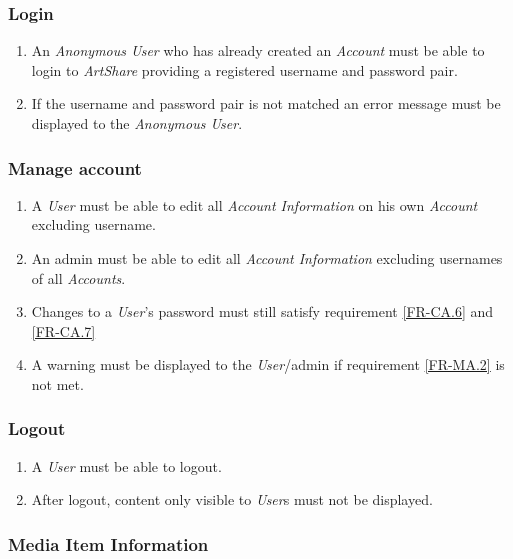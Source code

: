 \documentclass[../report.tex]{subfiles}
\begin{document}
\subsubsection {Login}
	
\begin{enumerate}[label=\textbf{FR-\twodigits*}, resume]
	\item An \textit{Anonymous User} who has already created an \textit{Account} must be able to login to \textit{ArtShare} providing a registered username and password pair.
	\item If the username and password pair is not matched an error message must be displayed to the \textit{Anonymous User}. 
\end{enumerate}
		
\subsubsection {Manage account}

\begin{enumerate}[label=\textbf{FR-\twodigits*}, resume]
	\item A \textit{User} must be able to edit all \textit{Account Information} on his own \textit{Account} excluding username.
	\item An admin must be able to edit all \textit{Account Information} excluding usernames of all \textit{Accounts}.
	\item Changes to a \textit{User}'s password must still satisfy requirement \ref{FR-CA.6} and \ref{FR-CA.7} \label{FR-MA.2}
	\item A warning must be displayed to the \textit{User}/admin if requirement \ref{FR-MA.2} is not met.	
\end{enumerate}
		
\subsubsection {Logout}
\begin{enumerate}[label=\textbf{FR-\twodigits*}, resume]
	\item A \textit{User} must be able to logout.
	\item After logout, content only visible to \textit{User}s must not be displayed.
\end{enumerate}
	
\subsubsection {Media Item Information} \label{FR-Media}
\end{document}
